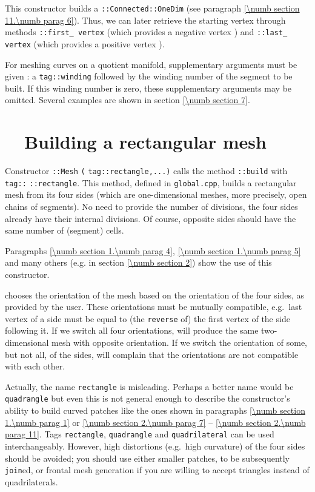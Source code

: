 This constructor builds a {\small\tt{}::Connected::OneDim}
(see paragraph \ref{\numb section 11.\numb parag 6}).
Thus, we can later retrieve the starting vertex through methods
{\small\tt{}::first\_\,vertex} (which provides a negative vertex {\small\tt{}})
and {\small\tt{}::last\_\,vertex} (which provides a positive vertex {\small\tt{}}).

For meshing curves on a quotient manifold, supplementary arguments must be given :
a {\small\tt\textcolor{tag}{tag}::winding} followed by the winding number of the segment
to be built.
If this winding number is zero, these supplementary arguments may be omitted.
Several examples are shown in section \ref{\numb section 7}.

\section{~~Building a rectangular mesh}\label{\numb section 12.\numb parag 3}

Constructor {\small\tt {}::Mesh} {\small\tt(}
{\small\tt\textcolor{tag}{tag}::rectangle,...)} calls the method {\small\tt{}::build}
with {\small\tt \textcolor{tag}{tag}::} {\small\tt::rectangle}.
This method, defined in {\small\tt global.cpp}, builds a rectangular mesh from its
four sides (which are one-dimensional meshes, more precisely, open chains of segments).
No need to provide the number of divisions, the four sides already have their internal divisions.
Of course, opposite sides should have the same number of (segment) cells.

Paragraphs \ref{\numb section 1.\numb parag 4}, \ref{\numb section 1.\numb parag 5} and
many others (e.g. in section \ref{\numb section 2}) show the use of this constructor.

{\ManiFEM} chooses the orientation of the mesh based on the orientation of the four sides,
as provided by the user.
These orientations must be mutually compatible, e.g.\ last vertex of a side must be equal to
(the {\small\tt reverse} of) the first vertex of the side following it.
If we switch all four orientations, {\maniFEM} will produce the same two-dimensional mesh
with opposite orientation.
If we switch the orientation of some, but not all, of the sides, {\maniFEM} will complain
that the orientations are not compatible with each other.

Actually, the name {\small\tt rectangle} is misleading.
Perhaps a better name would be {\small\tt quadrangle} but even this is not general enough to
describe the constructor's ability to build curved patches like the ones shown in paragraphs
\ref{\numb section 1.\numb parag 1} or \ref{\numb section 2.\numb parag 7} --
\ref{\numb section 2.\numb parag 11}.
Tags {\small\tt rectangle}, {\small\tt quadrangle} and {\small\tt quadrilateral} can be used
interchangeably.
However, high distortions (e.g.\ high curvature) of the four sides should be avoided;
you should use either smaller patches, to be subsequently {\small\tt join}ed,
or frontal mesh generation if you are willing to accept triangles instead of quadrilaterals.

